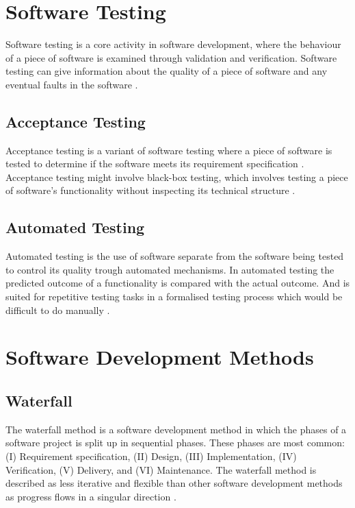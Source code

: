 \section{Software Testing}
Software testing is a core activity in software development, where the behaviour of a piece of software is examined through validation and verification. Software testing can give information about the quality of a piece of software and any eventual faults in the software \cite{software_testing_wiki_2023}.

\subsection{Acceptance Testing}
Acceptance testing is a variant of software testing where a piece of software is tested to determine if the software meets its requirement specification \cite{acceptance_testing_wiki_2023}. Acceptance testing might involve black-box testing, which involves testing a piece of software's functionality without inspecting its technical structure \cite{black_box_testing_wiki_2023}.

\subsection{Automated Testing}
Automated testing is the use of software separate from the software being tested to control its quality trough automated mechanisms. In automated testing the predicted outcome of a functionality is compared with the actual outcome. And is suited for repetitive testing tasks in a formalised testing process which would be difficult to do manually \cite{test_automation_wiki_2023}.

\section{Software Development Methods}
\subsection{Waterfall}
The waterfall method is a software development method in which the phases of a software project is split up in sequential phases. These phases are most common: (I) Requirement specification, (II) Design, (III) Implementation, (IV) Verification, (V) Delivery, and (VI) Maintenance. The waterfall method is described as less iterative and flexible than other software development methods as progress flows in a singular direction \cite{waterfall_model_wiki_2023}.

